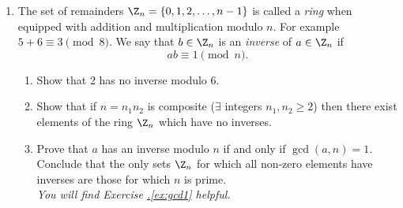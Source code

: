 \begin{enumerate}
  \item The set of remainders $\Z_n=\{0,1,2,\ldots,n-1\}$ is called a \emph{ring} when equipped with addition and multiplication modulo $n$. For example $5+6\equiv 3\pmod{8}$. We say that $b\in\Z_n$ is an \emph{inverse} of $a\in\Z_n$ if
	\[ab\equiv 1\pmod n.\]
	\begin{enumerate}
	  \item Show that 2 has no inverse modulo 6.
	  \item Show that if $n=n_1n_2$ is composite ($\exists$ integers $n_1,n_2\ge 2$) then there exist elements of the ring $\Z_n$ which have no inverses.
	  \item Prove that $a$ has an inverse modulo $n$ if and only if $\gcd(a,n)=1$. Conclude that the only sets $\Z_n$ for which all non-zero elements have inverses are those for which $n$ is prime.\\
	  \emph{You will find Exercise \hyperref[ex:gcd1]{\thesubsection.\ref*{ex:gcd1}} helpful.}
	\end{enumerate}
\end{enumerate}